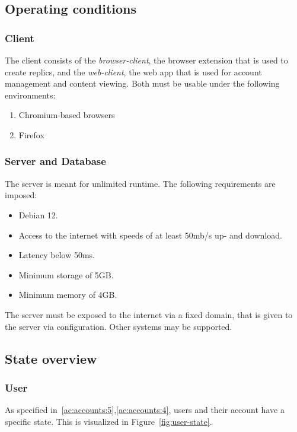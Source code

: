 \subsection{Operating conditions}\label{subsec:operating-conditions}

\subsubsection{Client}
The client consists of the \textit{browser-client}, the browser extension that is used to create replics, and the \textit{web-client}, the web app that is used for account management and content viewing.
Both must be usable under the following environments:

\begin{enumerate}
    \item Chromium-based browsers
    \item Firefox
\end{enumerate}

\subsubsection{Server and Database}
The server is meant for unlimited runtime.
The following requirements are imposed:
\begin{itemize}
    \item Debian 12.
    \item Access to the internet with speeds of at least 50mb/s up- and download.
    \item Latency below 50ms.
    \item Minimum storage of 5GB\@.
    \item Minimum memory of 4GB\@.
\end{itemize}

The server must be exposed to the internet via a fixed domain, that is given to the server via configuration.
Other systems may be supported.

\subsection{State overview}\label{subsec:state-management}
\subsubsection{User}
As specified in~\ref{ac:accounts:5},\ref{ac:accounts:4}, users and their account have a specific state.
This is visualized in Figure~\ref{fig:user-state}.

